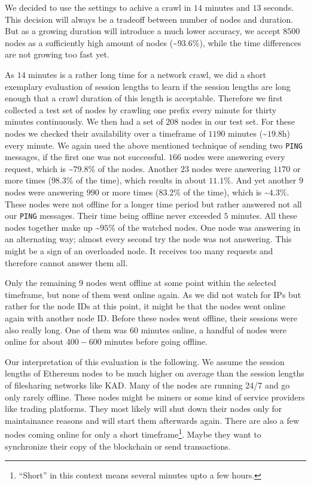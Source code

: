 \documentclass[10pt,conference,final]{IEEEtran}
\begin{document}
We decided to use the settings to achive a crawl in $14$ minutes and $13$ seconds.
This decision will always be a tradeoff between number of nodes and duration.
But as a growing duration will introduce a much lower accuracy, we accept $8500$ nodes as a sufficiently high amount of nodes (\textasciitilde\(93.6\%\)), while the time differences are not growing too fast yet.

As $14$ minutes is a rather long time for a network crawl, we did a short exemplary evaluation of session lengths to learn if the session lengths are long enough that a crawl duration of this length is acceptable.
Therefore we first collected a test set of nodes by crawling one prefix every minute for thirty minutes continuously.
We then had a set of $208$ nodes in our test set.
For these nodes we checked their availability over a timeframe of $1190$ minutes (\textasciitilde$19.8$h) every minute.
We again used the above mentioned technique of sending two \texttt{PING} messages, if the first one was not successful.
$166$ nodes were answering every request, which is \textasciitilde$79.8$\% of the nodes.
Another $23$ nodes were answering $1170$ or more times ($98.3$\% of the time), which results in about $11.1$\%.
And yet another $9$ nodes were answering $990$ or more times ($83.2$\% of the time), which is \textasciitilde$4.3$\%.
These nodes were not offline for a longer time period but rather answered not all our \texttt{PING} messages.
Their time being offline never exceeded $5$ minutes.
All these nodes together make up \textasciitilde$95$\% of the watched nodes.
One node was answering in an alternating way; almost every second try the node was not answering.
This might be a sign of an overloaded node.
It receives too many requests and therefore cannot answer them all.

Only the remaining 9 nodes went offline at some point within the selected timeframe, but none of them went online again.
As we did not watch for IPs but rather for the node IDs at this point, it might be that the nodes went online again with another node ID.
Before these nodes went offline, their sessions were also really long.
One of them was 60 minutes online, a handful of nodes were online for about $400-600$ minutes before going offline.

Our interpretation of this evaluation is the following.
We assume the session lengths of Ethereum nodes to be much higher on average than the session lengths of filesharing networks like KAD.
Many of the nodes are running 24/7 and go only rarely offline.
These nodes might be miners or some kind of service providers like trading platforms.
They most likely will shut down their nodes only for maintainance reasons and will start them afterwards again.
There are also a few nodes coming online for only a short timeframe\footnote{``Short'' in this context means several minutes upto a few hours.}.
Maybe they want to synchronize their copy of the blockchain or send transactions.
\end{document}
